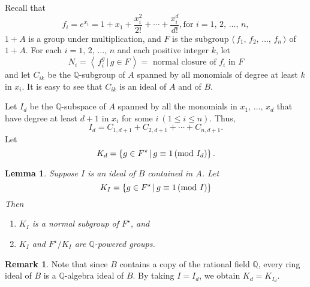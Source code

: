 \documentclass[mathscr]{amsart}
\theoremstyle{theorem}
\newtheorem{lemma}[theorem]{Lemma}
\theoremstyle{definition}
\newtheorem*{remarknn}{Remark}
\numberwithin{equation}{section}
\newcommand{\smod}[1]{\hspace*{-.1cm}\pmod{#1}}
\begin{document}
Recall that
\begin{equation}
f_i=e^{x_i}=1+x_1+\frac{x_i^2}{2!}+\cdots+ \frac{x_i^d}{d!},\text{
for }i=1,\,2,\,\dots,\,n, \label{eq5.1-3-28-07}
\end{equation}
$1+A$ is a group under multiplication, and $F$ is the subgroup
$\langle \,f_1,\,f_2,\,\dots,\,f_n\,\rangle$ of $1+A$.  For each
$i=1,\,2,\,\dots,\,n$ and each positive integer $k$, let
\begin{equation}
N_i=\left\langle\,f_i^g\,|\,g\in F\,\right\rangle = \text{ normal
closure of }f_i\text{ in }F\label{eq5.2-3-28-07}
\end{equation}
and let $C_{ik}$ be the $\mathbb{Q}$-subgroup of $A$ spanned by all
monomials of degree at least $k$ in $x_i$.  It is easy to see that
$C_{ik}$ is an ideal of $A$ and of $B$.

Let $I_d$ be the $\mathbb{Q}$-subspace of $A$ spanned by all the
monomials in $x_1,\,\dots,\,x_d$ that have degree at least $d+1$ in
$x_i$ for some $i~ (1\leq i\leq n)$.  Thus,
$$
I_d=C_{1,d+1}+C_{2,d+1}+\cdots+C_{n,d+1}.
$$
Let
$$
K_d=\left\{g\in F^\star\,|\,g\equiv 1\smod{I_d}\right\}.
$$

\begin{lemma}\label{lemma5.1-3-28-07}
Suppose $I$ is an ideal of $B$ contained in $A$.  Let
$$
K_I=\left\{g\in F^\star\,|\, g\equiv 1 \smod{I}\right\}
$$
Then
\begin{enumerate}
\item[(a)] $K_I$ is a normal subgroup of $F^\star$, and
\item[(b)] $K_I$ and $F^\star/K_I$ are $\mathbb{Q}$-powered groups.
\end{enumerate}
\end{lemma}

\begin{remarknn}
Note that since $B$ contains a copy of the rational field
$\mathbb{Q}$, every ring ideal of $B$ is a $\mathbb{Q}$-algebra
ideal of $B$. By taking $I=I_d$, we obtain $K_d=K_{I_d}.$
\end{remarknn}
\end{document}
